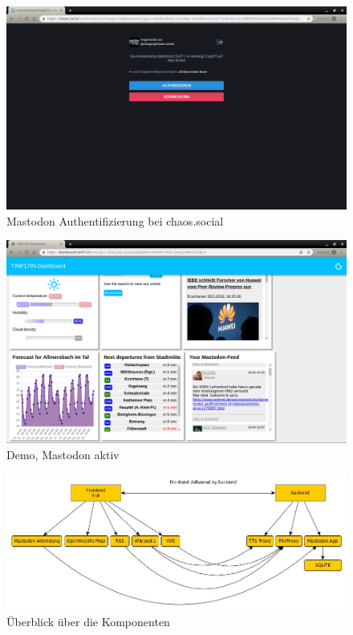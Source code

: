 \documentclass[fleqn,10pt]{SelfArx} %
\begin{document}
\begin{figure}
\includegraphics[width=\linewidth]{images/2.png}
\caption{Mastodon Authentifizierung bei chaos.social}\label{fig:demo2}
\end{figure}

\begin{figure}
    \includegraphics[width=\linewidth]{images/3.png}
    \caption{Demo, Mastodon aktiv}\label{fig:demo3}
\end{figure}
\begin{figure}
    \includegraphics[width=\linewidth]{systemcomponent.jpg}
    \caption{Überblick über die Komponenten}\label{fig:component}
\end{figure}
\end{document}
